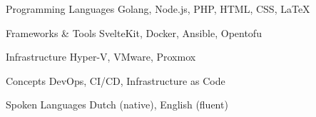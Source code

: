 
\begin{cvskills}

  \cvskill
    {Programming Languages} %
    {Golang, Node.js, PHP, HTML, CSS, \LaTeX} %

  \cvskill
    {Frameworks \& Tools} %
    {SvelteKit, Docker, Ansible, Opentofu} %

  \cvskill
    {Infrastructure} %
    {Hyper-V, VMware, Proxmox} %

  \cvskill
    {Concepts} %
    {DevOps, CI/CD, Infrastructure as Code} %

  \cvskill
    {Spoken Languages} %
    {Dutch (native), English (fluent)} %

\end{cvskills}
